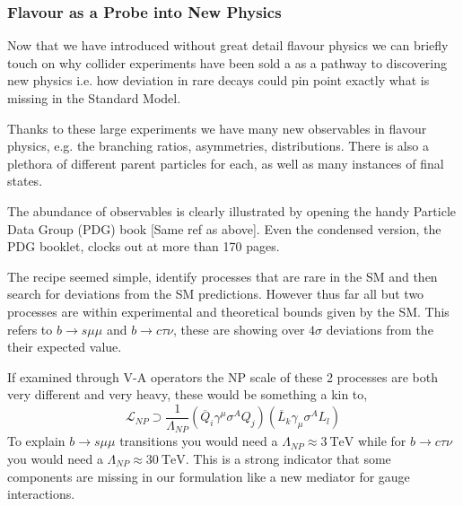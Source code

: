 
\subsubsection{Flavour as a Probe into New Physics}

Now that we have introduced without great detail flavour physics we can briefly touch on why collider experiments have been sold a as a pathway to discovering new physics i.e. how deviation in rare decays could pin point exactly what is missing in the Standard Model. 

Thanks to these large experiments we have many new observables in flavour physics, e.g. the branching ratios, asymmetries, distributions. There is also a plethora of different parent particles for each, as well as many instances of final states. 

The abundance of observables is clearly illustrated by opening the handy Particle Data Group (PDG) book [Same ref as above]. Even the condensed version, the PDG booklet, clocks out at more than 170 pages.


The recipe seemed simple, identify processes that are rare in the SM and then search for deviations from the SM predictions. However thus far all but two processes are within experimental and theoretical bounds given by the SM. This refers to $b \rightarrow s \mu \mu$ and $b \rightarrow c \tau \nu$, these are showing over $ 4 \sigma$ deviations from the their expected value. 

{\color{red} 
If examined through V-A operators the NP scale of these 2 processes are both very different and very heavy, these would be something a kin to, 
%
\begin{equation}
\mathcal{L}_{NP} \supset \frac{1}{\Lambda_{NP}} (\overline{Q}_i \gamma^\mu \sigma^A Q_j ) (\overline{L}_k \gamma_\mu \sigma^A L_l) 
\end{equation}
%
To explain $b \rightarrow s \mu \mu$ transitions you would need a $\Lambda_{NP} \approx 3 \ \text{TeV}$ while for $b \rightarrow c \tau \nu$ you would need a $\Lambda_{NP} \approx 30\ \text{TeV}$. This is a strong indicator that some components are missing in our formulation like a new mediator for gauge interactions.  

}

